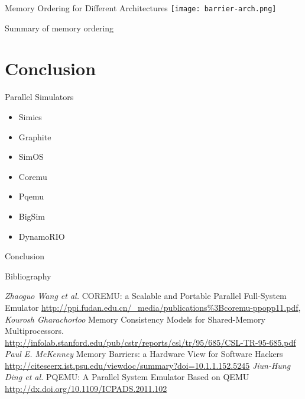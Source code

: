 \begin{frame}{Memory Ordering for Different Architectures}
  \centering
  \texttt{[image: barrier-arch.png]}

  \tiny{Summary of memory ordering~\cite{whymb}}
\end{frame}

\section*{Conclusion}

\begin{frame}{Parallel Simulators}
  \begin{itemize}
    \item Simics
    \item Graphite
    \item SimOS
    \item Coremu
    \item Pqemu
    \item BigSim
    \item DynamoRIO
  \end{itemize}
\end{frame}

\begin{frame}{Conclusion}
\end{frame}

\begin{frame}[allowframebreaks]{Bibliography}
  \begin{thebibliography}{99}
     \textit{Zhaoguo Wang et al.} COREMU: a Scalable and Portable Parallel Full-System Emulator \url{http://ppi.fudan.edu.cn/_media/publications\%3Bcoremu-ppopp11.pdf},
     \textit{Kourosh Gharachorloo} Memory Consistency Models for Shared-Memory Multiprocessors. \url{http://infolab.stanford.edu/pub/cstr/reports/csl/tr/95/685/CSL-TR-95-685.pdf}
     \textit{Paul E. McKenney} Memory Barriers: a Hardware View for Software Hackers \url{http://citeseerx.ist.psu.edu/viewdoc/summary?doi=10.1.1.152.5245}
     \textit{Jiun-Hung Ding et al.} PQEMU: A Parallel System Emulator Based on QEMU \url{http://dx.doi.org/10.1109/ICPADS.2011.102}
  \end{thebibliography}
\end{frame}

\finalslide


